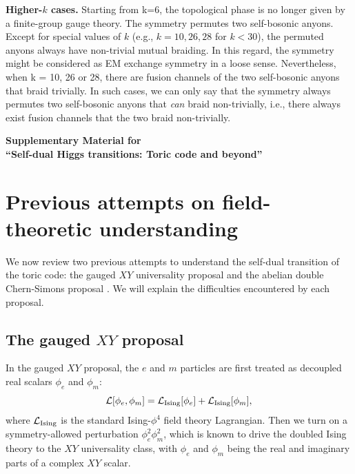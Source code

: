 \documentclass[aps, prl, superscriptaddress, twocolumn,
notitlepage, longbibliography,
floatfix]{revtex4-2}
\newcommand{\1}{\text{\uppercase\expandafter{\romannumeral1}}}
\newcommand{\2}{\text{\uppercase\expandafter{\romannumeral2}}}
\newcommand{\3}{\text{\uppercase\expandafter{\romannumeral3}}}
\newcommand{\4}{\text{\uppercase\expandafter{\romannumeral4}}}
\newcommand{\5}{\text{\uppercase\expandafter{\romannumeral5}}}
\newcommand{\6}{\text{\uppercase\expandafter{\romannumeral6}}}
\begin{document}
\textbf{Higher-$k$ cases.} Starting from k=6, the topological phase is no longer given by a finite-group gauge theory. The symmetry permutes two self-bosonic anyons. Except for special values of $k$ (e.g., $k =10, 26, 28$ for $k<30$), the permuted anyons always have non-trivial mutual braiding. In this regard, the symmetry might be considered as EM exchange symmetry in a loose sense. Nevertheless, when k = 10, 26 or 28, there are fusion channels of the two self-bosonic anyons that braid trivially. In such cases, we can only say that the symmetry always permutes two self-bosonic anyons that \textit{can} braid non-trivially, i.e., there always exist fusion channels that the two braid non-trivially.








\clearpage
\onecolumngrid

\begin{center}
\textbf{\large Supplementary Material for\\
``Self-dual Higgs transitions: Toric code and beyond''}
\end{center}


\section{Previous attempts on field-theoretic understanding}

We now review two previous attempts to understand the self-dual transition of the toric code: the gauged $XY$ universality proposal \cite{BonatiPelissettoVicari} and the abelian double Chern-Simons proposal \cite{ShiChatterjee2024,Serna:2024fqo}. We will explain the difficulties encountered by each proposal.

\subsection{The gauged $XY$ proposal}

In the gauged $XY$ proposal, the $e$ and $m$ particles are first treated as decoupled real scalars $\phi_{e}$ and $\phi_m$:
\begin{equation}
    \mathcal{L}[\phi_{e},\phi_m]=\mathcal{L}_{\rm Ising}[\phi_e]+\mathcal{L}_{\rm Ising}[\phi_m],
\end{equation}
where $\mathcal{L}_{\rm Ising}$ is the standard Ising-$\phi^4$ field theory Lagrangian. Then we turn on a symmetry-allowed perturbation $\phi_e^2\phi_m^2$, which is known to drive the doubled Ising theory to the $XY$ universality class, with $\phi_e$ and $\phi_m$ being the real and imaginary parts of a complex $XY$ scalar.
\end{document}
